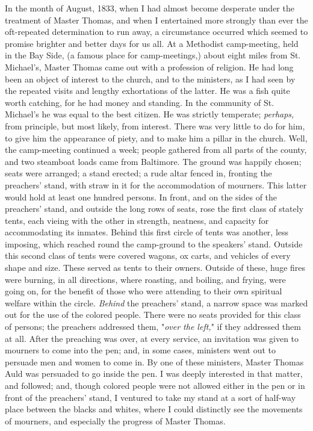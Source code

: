 In the month of August, 1833, when I had almost become desperate under
the treatment of Master Thomas, and when I entertained more strongly
than ever the oft-repeated determination to run away, a circumstance
occurred which seemed to promise brighter and better days for us all. At
a Methodist camp-meeting, held in the Bay Side, (a famous place for
camp-meetings,) about eight miles from St. Michael's, Master Thomas came
out with a profession of religion. He had long been an object of
interest to the church, and to the ministers, as I had seen by the
repeated visits and lengthy exhortations of the latter. He was a fish
quite worth catching, for he had money and standing. In the community of
St. Michael's he was equal to the best citizen. He was strictly
temperate; \emph{perhaps,} from principle, but most likely, from
interest. There was very little to do for him, to give him the
appearance of piety, and to make him a pillar in the church. Well, the
camp-meeting continued a week; people gathered from all parts of the
county, and two steamboat loads came from Baltimore. The ground was
happily chosen; seats were arranged; a stand erected; a rude altar
fenced in, fronting the preachers' stand, with straw in it for the
accommodation of mourners. This latter would hold at least one hundred
persons. In front, and on the sides of the preachers' stand, and outside
the long rows of seats, rose the first class of stately tents, each
vieing with the other in strength, neatness, and capacity for
accommodating its inmates. Behind this {}first circle of tents was
another, less imposing, which reached round the camp-ground to the
speakers' stand. Outside this second class of tents were covered wagons,
ox carts, and vehicles of every shape and size. These served as tents to
their owners. Outside of these, huge fires were burning, in all
directions, where roasting, and boiling, and frying, were going on, for
the benefit of those who were attending to their own spiritual welfare
within the circle. \emph{Behind} the preachers' stand, a narrow space
was marked out for the use of the colored people. There were no seats
provided for this class of persons; the preachers addressed them,
"\emph{over the left,}" if they addressed them at all. After the
preaching was over, at every service, an invitation was given to
mourners to come into the pen; and, in some cases, ministers went out to
persuade men and women to come in. By one of these ministers, Master
Thomas Auld was persuaded to go inside the pen. I was deeply interested
in that matter, and followed; and, though colored people were not
allowed either in the pen or in front of the preachers' stand, I
ventured to take my stand at a sort of half-way place between the blacks
and whites, where I could distinctly see the movements of mourners, and
especially the progress of Master Thomas.


